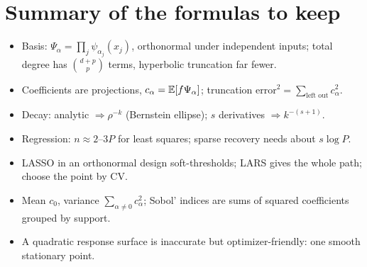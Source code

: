 \section*{Summary of the formulas to keep}
\begin{itemize}[nosep]
  \item Basis: $\Psi_\alpha = \prod_j \psi_{\alpha_j}(x_j)$, orthonormal under independent inputs; total degree has
        $\binom{d+p}{p}$ terms, hyperbolic truncation far fewer.
  \item Coefficients are projections, $c_\alpha = \mathbb{E}[f\Psi_\alpha]$; truncation error$^2 = \sum_{\text{left out}}
        c_\alpha^2$.
  \item Decay: analytic $\Rightarrow \rho^{-k}$ (Bernstein ellipse); $s$ derivatives $\Rightarrow k^{-(s+1)}$.
  \item Regression: $n \approx 2$--$3P$ for least squares; sparse recovery needs about $s\log P$.
  \item LASSO in an orthonormal design soft-thresholds; LARS gives the whole path; choose the point by CV.
  \item Mean $c_0$, variance $\sum_{\alpha\ne0}c_\alpha^2$; Sobol' indices are sums of squared coefficients grouped
        by support.
  \item A quadratic response surface is inaccurate but optimizer-friendly: one smooth stationary point.
\end{itemize}
